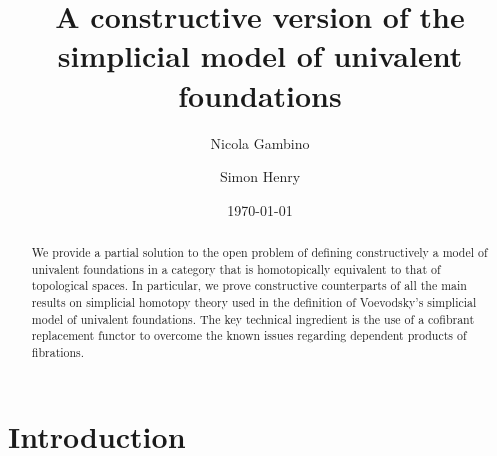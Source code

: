 \documentclass[reqno,10pt,a4paper,oneside,draft]{amsart}
\title[]{A constructive version of the \\ simplicial model of univalent foundations}
\begin{document}
\begin{abstract}
We provide a partial solution to the open problem of defining constructively a model of univalent foundations in a category that is homotopically equivalent to that of topological spaces.
In particular, we prove constructive counterparts of all the main results on simplicial homotopy theory
used in the definition of Voevodsky's simplicial model of univalent foundations. The key technical ingredient
is the use of a cofibrant replacement functor to overcome the known issues regarding dependent products of fibrations.
\end{abstract}

\author{Nicola Gambino}
\address{School of Mathematics, University of Leeds, Leeds LS2 9JT, United Kingdom}


\author{Simon Henry}


 \date{\today}
 
 

\maketitle

\tableofcontents

\newpage

\section{Introduction} 
\end{document}
